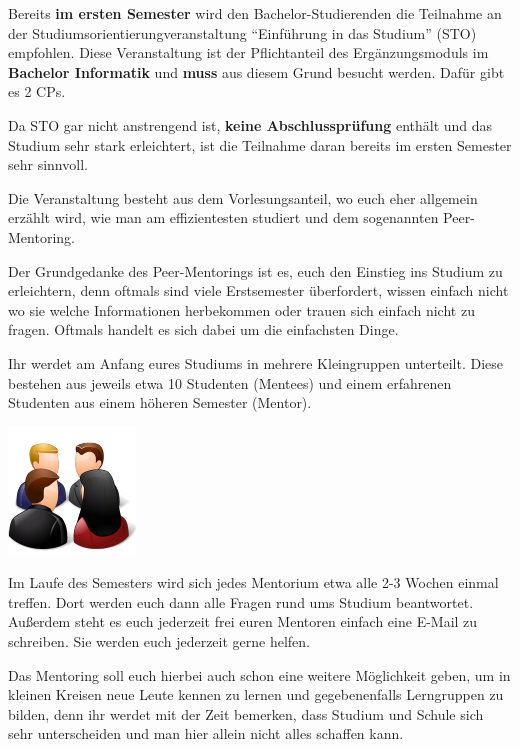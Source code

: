 Bereits \textbf{im ersten Semester} wird den Bachelor-Studierenden die Teilnahme an der Studiumsorientierungveranstaltung “Einführung in das Studium” (STO) empfohlen. Diese Veranstaltung ist der Pflichtanteil des Ergänzungsmoduls im \textbf{Bachelor Informatik} und \textbf{muss} aus diesem Grund besucht werden. Dafür gibt es 2 CPs.

Da STO gar nicht anstrengend ist, \textbf{keine Abschlussprüfung} enthält und das Studium sehr stark erleichtert, ist die Teilnahme daran bereits im ersten Semester sehr sinnvoll.

Die Veranstaltung besteht aus dem Vorlesungsanteil, wo euch eher allgemein erzählt wird, wie man am effizientesten studiert und dem sogenannten Peer-Mentoring.

Der Grundgedanke des Peer-Mentorings ist es, euch den Einstieg ins Studium zu erleichtern, denn oftmals sind viele Erstsemester überfordert, wissen einfach nicht wo sie welche Informationen herbekommen oder trauen sich einfach nicht zu fragen. Oftmals handelt es sich dabei um die einfachsten Dinge.

Ihr werdet am Anfang eures Studiums in mehrere Kleingruppen unterteilt. Diese bestehen aus jeweils etwa 10 Studenten (Mentees) und einem erfahrenen Studenten aus einem höheren Semester (Mentor).

\begin{center}
	\includegraphics[scale=1.0]{comics/groups-meeting-light-icon}
\end{center}

Im Laufe des Semesters wird sich jedes Mentorium etwa alle 2-3 Wochen einmal treffen. Dort werden euch dann alle Fragen rund ums Studium beantwortet. Außerdem steht es euch jederzeit frei euren Mentoren einfach eine E-Mail zu schreiben. Sie werden euch jederzeit gerne helfen.

Das Mentoring soll euch hierbei auch schon eine weitere Möglichkeit geben, um in kleinen Kreisen neue Leute kennen zu lernen und gegebenenfalls Lerngruppen zu bilden, denn ihr werdet mit der Zeit bemerken, dass Studium und Schule sich sehr unterscheiden und man hier allein nicht alles schaffen kann.

